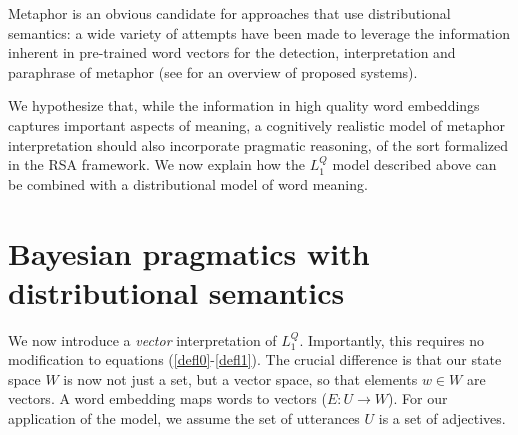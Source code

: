 \documentclass[9pt,twocolumn,twoside,lineno]{pnas-new}
\newcommand{\Listener}{L}
\newcommand{\QLONE}{\Listener_{{1}}^{{Q}}}
\begin{document}

	

		

	Metaphor is an obvious candidate for approaches that use distributional semantics: a wide variety of attempts have been made to leverage the information inherent in pre-trained word vectors for the detection, interpretation and paraphrase of metaphor (see \cite{shutova2016design} for an overview of proposed systems).

	We hypothesize that, while the information in high quality word embeddings captures important aspects of meaning, a cognitively realistic model of metaphor interpretation should also incorporate pragmatic reasoning, of the sort formalized in the RSA framework. We now explain how the $\QLONE$ model described above can be combined with a distributional model of word meaning.

	\section{Bayesian pragmatics with distributional semantics} \label{bayesdist}


	We now introduce a \emph{vector} interpretation of $\QLONE$. Importantly, this requires no modification to equations (\ref{defl0}-\ref{defl1}). The crucial difference is that our state space $W$ is now not just a set, but a vector space, so that elements $w\in W$ are vectors. A word embedding maps words to vectors ($E : U\to W$).
	For our application of the model, we assume the set of utterances $U$ is a set of adjectives. 
\end{document}
